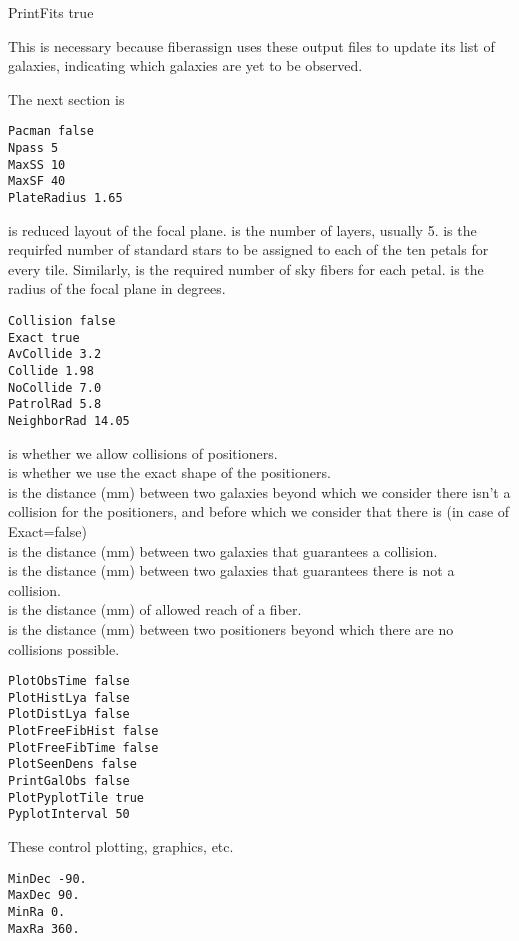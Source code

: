 \documentclass[12pt]{article}
\begin{document}
 PrintFits true
 
 This is necessary because fiberassign uses these output files to update its list of galaxies, indicating which galaxies are yet to be observed.  
 


The next section is 
\begin{verbatim}
Pacman false
Npass 5
MaxSS 10
MaxSF 40
PlateRadius 1.65
\end{verbatim}
 is reduced layout of the focal plane.  is the number of layers, usually 5.   is the requirfed number of standard stars to be assigned to each of the ten petals for every tile.  Similarly,  is the required number of sky fibers for each petal.   is the radius of the focal plane in degrees.
\begin{verbatim}
Collision false
Exact true
AvCollide 3.2
Collide 1.98
NoCollide 7.0
PatrolRad 5.8
NeighborRad 14.05
\end{verbatim}

 is whether we allow collisions of positioners. \\
  is whether we use the exact shape of the positioners. \\
   is  the distance (mm) between two galaxies beyond which we consider there isn't a collision for the positioners, and before which we consider that there is (in case of Exact=false)
 \\
  is the distance (mm) between two galaxies that guarantees a collision.\\
  is the distance (mm) between two galaxies that guarantees there is not a collision.\\
  is the distance (mm) of allowed reach of a fiber.\\
  is the distance (mm) between two positioners beyond which there are no collisions possible.
 
 \begin{verbatim}
PlotObsTime false
PlotHistLya false
PlotDistLya false
PlotFreeFibHist false
PlotFreeFibTime false
PlotSeenDens false
PrintGalObs false
PlotPyplotTile true
PyplotInterval 50
\end{verbatim}
These control plotting, graphics, etc.

\begin{verbatim}
MinDec -90.
MaxDec 90.
MinRa 0.
MaxRa 360.

\end{verbatim}
\end{document}
